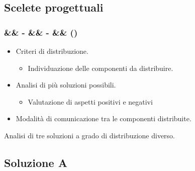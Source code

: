 \documentclass[slidestop,compress,blackandwhite]{beamer}
\newcommand{\ii}[1]{\textit{#1}}
\newcommand{\newtitle}[4]{
	#1 
	\ifx&#2&%
	\else
  		\large- #2
	\fi
	\ifx&#3&%
	\else
  		\normalsize- #3
	\fi
	\ifx&#4&%
	\else
  		\normalsize (#4)
	\fi
}
\newcommand{\newframe}[5]{
	\begin{frame}
		\frametitle{\newtitle{#1}{#2}{#3}{#4}}
		#5
	\end{frame}
}
\newcommand{\myitemize}[1]{\begin{itemize}#1\end{itemize}}
\begin{document}
		
%		
%		
%	
%	

%	
%	
%	
	
	\subsection{Scelete progettuali}\label{scelte}
	
	\newframe{}{}{}{}{
		
		\begin{itemize}
			\item Criteri di distribuzione.
				\myitemize{
					\item Individuazione delle componenti da distribuire.
				}
			\item Analisi di più soluzioni possibili.
				\myitemize{
					\item Valutazione di aspetti positivi e negativi
				}
			\item Modalità di comunicazione tra le componenti distribuite.
		\end{itemize}
		
		Analisi di tre soluzioni a grado di distribuzione diverso. 
		
	}
	
	\subsection{Soluzione A}\label{sol_a}
	
\end{document}
